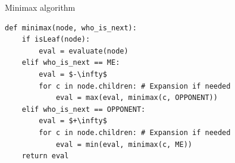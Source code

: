 \begin{algorithm}
\caption{Minimax algorithm}
\begin{lstlisting}[mathescape=true]
def minimax(node, who_is_next):
    if isLeaf(node): 
        eval = evaluate(node)
    elif who_is_next == ME:
        eval = $-\infty$
        for c in node.children: # Expansion if needed
            eval = max(eval, minimax(c, OPPONENT))
    elif who_is_next == OPPONENT:
        eval = $+\infty$
        for c in node.children: # Expansion if needed
            eval = min(eval, minimax(c, ME))
    return eval
\end{lstlisting}
\end{algorithm}